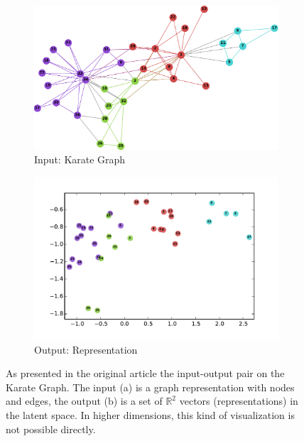 \begin{figure}[ht!]
	\centering
        \vspace{0.5cm}
        \begin{subfigure}[b]{0.45\columnwidth}
                \includegraphics[width=\columnwidth]{figures/karate_graph.pdf}
                \caption{Input: Karate Graph}
                \label{fig:toy_example_graph}
        \end{subfigure}
        \begin{subfigure}[b]{0.45\columnwidth}
                \includegraphics[width=\columnwidth]{figures/karate.pdf}
                \caption{Output: Representation}
                \label{fig:toy_example_embedding}
        \end{subfigure}
        \vspace{0.25cm}
        \caption{
		As presented in the original article the input-output pair on the Karate Graph. The input (a) is a graph representation with nodes and edges, the output (b) is a set of $\mathbb{R}^2$ vectors (representations) in the latent space. In higher dimensions, this kind of visualization is not possible directly.
        }
        \vspace{0.5cm}
        \label{fig:toy_example}
\end{figure}

